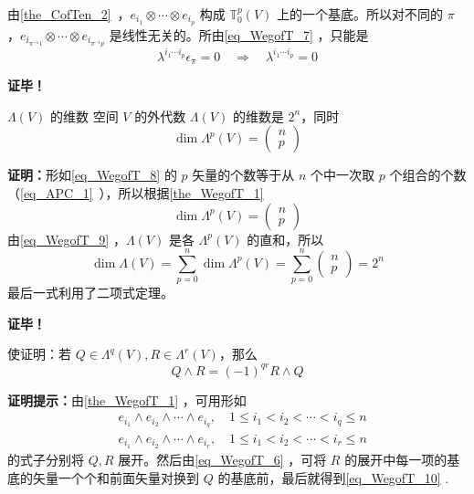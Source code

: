 由\autoref{the_CofTen_2}~，$e_{i_1}\otimes\cdots\otimes e_{i_p}$ 构成 $\mathbb T_0^p(V)$ 上的一个基底。所以对不同的 $\pi$ ，$e_{i_{\pi^{-1} 1}}\otimes\cdots\otimes e_{i_{\pi^{-1} p}}$ 是线性无关的。所由\autoref{eq_WegofT_7}  ，只能是
\begin{equation}
\lambda^{i_1\cdots i_p}\epsilon_\pi=0\quad\Rightarrow\quad\lambda^{i_1\cdots i_p}=0
\end{equation}

\textbf{证毕！}
\begin{corollary}{ $\Lambda(V)$ 的维数}
空间 $V$ 的外代数 $\Lambda(V)$ 的维数是 $2^n$，同时
\begin{equation}
\dim\Lambda^p(V)=\left(\begin{aligned}
n\\p
\end{aligned}\right)
\end{equation}
\end{corollary}
\textbf{证明：}形如\autoref{eq_WegofT_8}  的 $p$ 矢量的个数等于从 $n$ 个中一次取 $p$ 个组合的个数（\autoref{eq_APC_1}~），所以根据\autoref{the_WegofT_1} 
\begin{equation}
\dim\Lambda^p(V)=\left(\begin{aligned}
n\\p
\end{aligned}\right)
\end{equation}
由\autoref{eq_WegofT_9}  ，$\Lambda(V)$ 是各 $\Lambda^p(V)$ 的直和，所以
\begin{equation}
\dim\Lambda(V)=\sum_{p=0}^n\dim\Lambda^p(V)=\sum_{p=0}^n\left(\begin{aligned}
n\\p
\end{aligned}\right)=2^n
\end{equation}
 最后一式利用了二项式定理。

\textbf{证毕！}

\begin{example}{}
使证明：若 $Q\in\Lambda^q(V), R\in\Lambda^r(V)$，那么
\begin{equation}\label{eq_WegofT_10}
Q\wedge R=(-1)^{qr}R\wedge Q
\end{equation}

\textbf{证明提示：}由\autoref{the_WegofT_1}  ，可用形如
 \begin{equation}
\begin{aligned}
&e_{i_1}\wedge e_{i_2}\wedge\cdots\wedge e_{i_q},\quad 1\leq i_1<i_2<\cdots<i_q\leq n\\
&e_{i_1}\wedge e_{i_2}\wedge\cdots\wedge e_{i_r},\quad 1\leq i_1<i_2<\cdots<i_r\leq n
\end{aligned}
\end{equation}
的式子分别将 $Q,R$ 展开。然后由\autoref{eq_WegofT_6}  ，可将 $R$ 的展开中每一项的基底的矢量一个个和前面矢量对换到 $Q$ 的基底前，最后就得到\autoref{eq_WegofT_10} .
\end{example}
